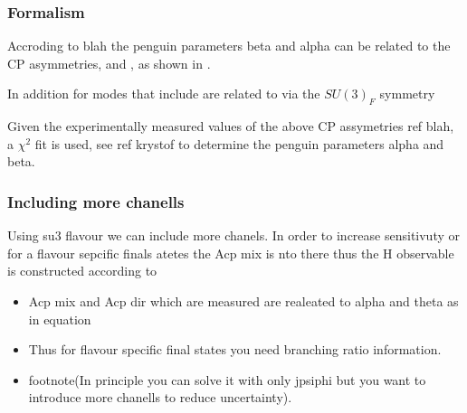 \subsubsection{Formalism}

Accroding to blah the penguin parameters beta and alpha can be related to the CP asymmetries,  and ,
as shown in \equref{}.


In addition for modes that include are related to \BsJpsiPhi via the $SU(3)_F$ symmetry


 Given the experimentally measured values of the above CP assymetries {\color{red} ref blah}, a $\chi^2$ fit is
used, see ref {\color{red} krystof} to determine the penguin parameters alpha and beta.

\subsubsection{Including more chanells}
Using su3 flavour we can include more chanels.
In order to increase sensitivuty or for a flavour sepcific finals atetes the Acp mix is nto there thus the H observable is constructed
according to

\begin{itemize}
  \item Acp mix and Acp dir which are measured are realeated to alpha and theta as in equation
  \item Thus for flavour specific final states you need branching ratio information.
  \item footnote(In principle you can solve it with only jpsiphi but you want to introduce more chanells to reduce uncertainty).
\end{itemize}


